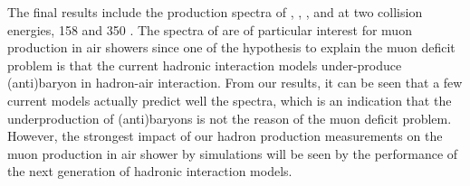The final results include the production spectra of \pions, \kaons, \protons, \lambs and \kzeros
at two collision energies, 158 and 350 \GeV. The spectra of \protons are of particular interest
for muon production in air showers since one of the hypothesis to explain the muon deficit problem
is that the current hadronic interaction models under-produce (anti)baryon in hadron-air interaction.
From our results, it can be seen that a few current models actually predict well the \proton spectra,
which is an indication that the underproduction of (anti)baryons is not the reason of the
muon deficit problem. However, the strongest impact of our hadron production measurements
on the muon production in air shower by simulations will be seen by the performance of the next
generation of hadronic interaction models.














































